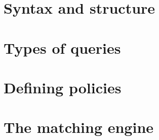 
\section{Syntax and structure}
\section{Types of queries}
\section{Defining policies}
\section{The matching engine} 
\label{subsec:matchingEngine} %
